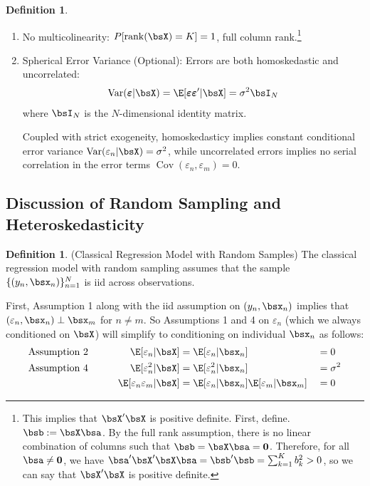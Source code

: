 \documentclass[12pt]{article}
\theoremstyle{plain}
\theoremstyle{definition}
\newtheorem{defn}[thm]{Definition}
\theoremstyle{remark}
\newcommand{\bsvarepsilon}{\boldsymbol{\varepsilon}}
\renewcommand{\bso}{\boldsymbol{0}}
\newcommand{\Cov}{\operatorname{Cov}}
\newcommand{\rank}{\operatorname{rank}}
\newcommand{\Var}{\operatorname{Var}}
\newcommand{\nN}{_{n=1}^N}
\begin{document}
\begin{defn}
\begin{enumerate}
  \item No multicolinearity: $P[\rank(\bsX)=K]=1$, full column
    rank.\footnote{%
      This implies that $\bsX'\bsX$ is positive definite. First, define.
      $\bsb:=\bsX \bsa$. By the full rank assumption, there is no linear
      combination of columns such that $\bsb=\bsX\bsa = \bso$.
      Therefore, for all $\bsa\neq \bso$, we have
      $\bsa'\bsX'\bsX\bsa=\bsb'\bsb = \sum_{k=1}^K b_k^2 > 0$, so we can
      say that $\bsX'\bsX$ is positive definite.
    }

  \item Spherical Error Variance (Optional): Errors are both
    homoskedastic and uncorrelated:
    \begin{align*}
      \Var(\bsvarepsilon|\bsX) =
      \E[\bsvarepsilon\bsvarepsilon'|\bsX] = \sigma^2\bsI_N
    \end{align*}
    where $\bsI_N$ is the $N$-dimensional identity matrix.

    Coupled with strict exogeneity, homoskedasticy implies constant
    conditional error variance $\Var(\varepsilon_n|\bsX)=\sigma^2$,
    while uncorrelated errors implies no serial correlation
    in the error terms $\Cov(\varepsilon_n,\varepsilon_m)=0$.
\end{enumerate}
\end{defn}

\clearpage
\subsection{Discussion of Random Sampling and Heteroskedasticity}
\label{sec:discusshetero}

\begin{defn}(Classical Regression Model with Random Samples)
The classical regression model with random sampling assumes that the
sample $\{(y_n,\bsx_n)\}\nN$ is iid across observations.

First, Assumption 1 along with the iid assumption on
$(y_n,\bsx_n)$ implies that $(\varepsilon_n, \bsx_n)\perp \bsx_m$ for
$n\neq m$.
So Assumptions 1 and 4 on $\varepsilon_n$ (which we always
conditioned on $\bsX$) will simplify to conditioning on individual
$\bsx_n$ as follows:
\begin{alignat*}{5}
  \text{Assumption 2} &&\qquad
   \E[\varepsilon_n | \bsX] &=
   \E[\varepsilon_n | \bsx_n] &&= 0\\
  \text{Assumption 4} &&\qquad
   \E[\varepsilon_n^2 | \bsX] &=
   \E[\varepsilon_n^2 | \bsx_n] &&= \sigma^2\\
  \text{} &&\qquad
   \E[\varepsilon_n\varepsilon_m|\bsX] &=
   \E[\varepsilon_n|\bsx_n] \E[\varepsilon_m|\bsx_m]
   &&=0
\end{alignat*}
\end{defn}
\end{document}
